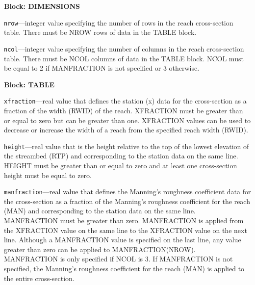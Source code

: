 
\item \textbf{Block: DIMENSIONS}

\begin{description}
\item \texttt{nrow}---integer value specifying the number of rows in the reach cross-section table. There must be NROW rows of data in the TABLE block.

\item \texttt{ncol}---integer value specifying the number of columns in the reach cross-section table. There must be NCOL columns of data in the TABLE block. NCOL must be equal to 2 if MANFRACTION is not specified or 3 otherwise.

\end{description}
\item \textbf{Block: TABLE}

\begin{description}
\item \texttt{xfraction}---real value that defines the station (x) data for the cross-section as a fraction of the width (RWID) of the reach. XFRACTION must be greater than or equal to zero but can be greater than one. XFRACTION values can be used to decrease or increase the width of a reach from the specified reach width (RWID).

\item \texttt{height}---real value that is the height relative to the top of the lowest elevation of the streambed (RTP) and corresponding to the station data on the same line. HEIGHT must be greater than or equal to zero and at least one cross-section height must be equal to zero.

\item \texttt{manfraction}---real value that defines the Manning's roughness coefficient data for the cross-section as a fraction of the Manning's roughness coefficient for the reach (MAN) and corresponding to the station data on the same line. MANFRACTION must be greater than zero. MANFRACTION is applied from the XFRACTION value on the same line to the XFRACTION value on the next line. Although a MANFRACTION value is specified on the last line, any value greater than zero can be applied to MANFRACTION(NROW). MANFRACTION is only specified if NCOL is 3. If MANFRACTION is not specified, the Manning's roughness coefficient for the reach (MAN) is applied to the entire cross-section.

\end{description}

